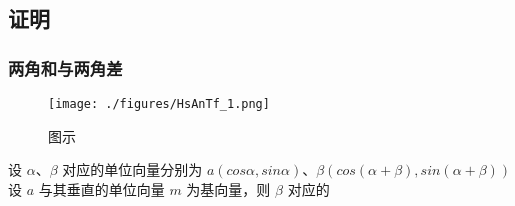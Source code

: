 \subsection{证明}
\subsubsection{两角和与两角差}
\begin{figure}[ht]
\centering
\texttt{[image: ./figures/HsAnTf\_1.png]}
\caption{图示} \label{HsAnTf_fig1}
\end{figure}
设 $\alpha$、$\beta$ 对应的单位向量分别为 $a(cos\alpha,sin\alpha)$、$\beta(cos(\alpha+\beta),sin(\alpha+\beta))$\\
设 $a$ 与其垂直的单位向量 $m$ 为基向量，则 $\beta$ 对应的